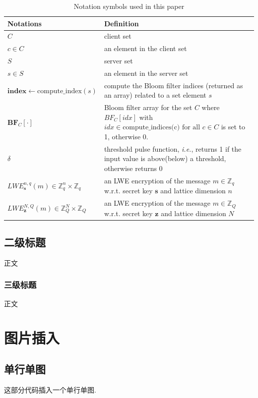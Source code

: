 \documentclass[12pt, a4paper, oneside]{ctexart}
\begin{document}
\begin{table}[htbp]
	\centering
	\caption{Notation symbols used in this paper}
	\begin{tabularx}{\textwidth}{ p{5cm} L }
		\toprule
		Notations  & Definition \\
		\midrule
		$C$ & client set \\
		$c\in C$ & an element in the client set \\
		$S$ & server set \\
		$s\in S$ & an element in the server set \\
		$\mathbf{index} \gets \text{compute\_index}(s)$ & compute the Bloom filter indices (returned as an array) related to a set element $s$\\
		$\mathbf{BF}_{C}[\cdot]$ & Bloom filter array for the set $C$ where $BF_{C}[idx]$ with $idx\in \text{compute\_indices(c) for all } c\in C$ is set to 1, otherwise 0.\\
		$\delta$   & threshold pulse function, \textit{i.e.}, returns 1 if the input value is above(below) a threshold, otherwise returns 0\\
		$LWE_{\mathbf{s}}^{n,q}(m) \in \mathbb{Z}_q^n\times \mathbb{Z}_q $ & an LWE encryption of the message $m\in \mathbb{Z}_q$ w.r.t. secret key $\mathbf{s}$ and lattice dimension $n$\\
		$LWE_{\mathbf{z}}^{N,Q}(m) \in \mathbb{Z}_Q^N\times \mathbb{Z}_Q $ & an LWE encryption of the message $m\in \mathbb{Z}_Q$ w.r.t. secret key $\mathbf{z}$ and lattice dimension $N$\\
		\bottomrule
	\end{tabularx}
\end{table}

\subsection{二级标题}
正文

\subsubsection{三级标题}
正文

\section{图片插入}

\subsection{单行单图}
	这部分代码插入一个单行单图.
\end{document}
